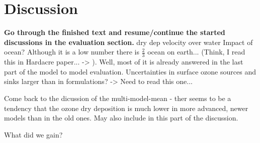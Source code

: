 \documentclass[gmd, manuscript]{copernicus}
\begin{document}
\section{Discussion}
\label{sec:disc}

{\bf Go through the finished text and resume/continue the started discussions in the evaluation section.}
dry dep velocity over water \citep{JGR:Helmig2012} Impact of ocean? Although it is a low number there is $\frac{2}{3}$ ocean on earth... (Think, I read this in Hardacre paper... -> \citet{ACP:Luhar2017}). Well, most of it is already answered in the last part of the model to model evaluation.
\citep{AE:Derwent2018} Uncertainties in surface ozone sources and sinks larger than in formulations? -> Need to read this one...

Come back to the dicussion of the multi-model-mean - ther seems to be a tendency that the ozone dry deposition is much lower in more advanced, newer models than in the old ones. May also include \citep{AE:Hu2017} in this part of the discussion.



\conclusions  %
\label{sec:conc}
What did we gain?










\appendix
\end{document}
